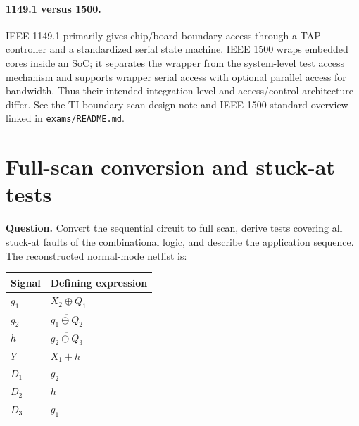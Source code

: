 \documentclass[11pt]{article}
\begin{document}
\paragraph{1149.1 versus 1500.}
IEEE 1149.1 primarily gives chip/board boundary access through a TAP controller
and a standardized serial state machine. IEEE 1500 wraps embedded cores inside
an SoC; it separates the wrapper from the system-level test access mechanism
and supports wrapper serial access with optional parallel access for bandwidth.
Thus their intended integration level and access/control architecture differ.
See the TI boundary-scan design note and IEEE 1500 standard overview linked in
\texttt{exams/README.md}.

\section{Full-scan conversion and stuck-at tests}
\textbf{Question.} Convert the sequential circuit to full scan, derive tests
covering all stuck-at faults of the combinational logic, and describe the
application sequence. The reconstructed normal-mode netlist is:
\begin{center}\begin{tabular}{ll}\toprule Signal & Defining expression\\\midrule
$g_1$ & $\overline{X_2\oplus Q_1}$\\
$g_2$ & $\overline{g_1\oplus Q_2}$\\
$h$ & $\overline{g_2\oplus Q_3}$\\
$Y$ & $X_1+h$\\
$D_1$ & $g_2$\\
$D_2$ & $h$\\
$D_3$ & $g_1$\\
\bottomrule\end{tabular}\end{center}
\begin{center}\end{center}
\end{document}
